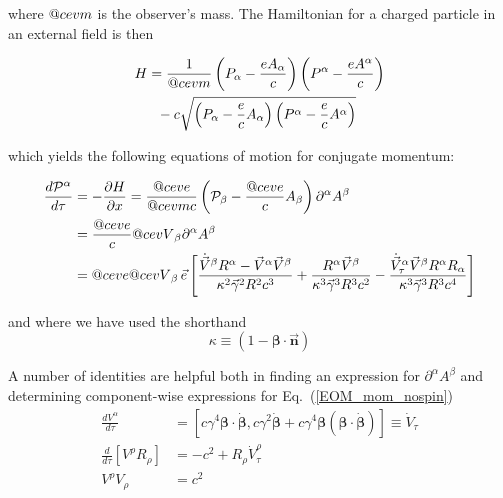 \documentclass[reprint,
               amsmath,amssymb,nofootinbib, aps%
              ]{revtex4-2}
\makeatletter
\DeclareRobustCommand{\cev}[1]{%
  {\mathpalette\do@cev{#1}}%
}
\newcommand{\do@cev}[2]{%
  \vbox{\offinterlineskip
    \sbox\z@{$\m@th#1 x$}%
    \ialign{##\cr
      \hidewidth\reflectbox{$\m@th#1\vec{}\mkern4mu$}\hidewidth\cr
      \noalign{\kern-\ht\z@}
      $\m@th#1#2$\cr
    }%
  }%
}
\makeatother
\begin{document}
\noindent where $\cev{m}$ is the observer's mass. The Hamiltonian for a charged particle in an external field is then~\cite{jackson2012classical,barut1980electrodynamics}

\begin{align}
    H&=\frac{1}{\cev{m}}\left(P_{\alpha}-\frac{e A_{\alpha}}{c}\right)\left(P^{\alpha}-\frac{e A^{\alpha}}{c}\right)
\nonumber \\
&~~-c \sqrt{\left(P_{\alpha}-\frac{e}{c} A_{\alpha}\right)\left(P^{\alpha}-\frac{e}{c} A^{\alpha}\right)}
\end{align}

\noindent which yields the following equations of motion for conjugate momentum:

\begin{align}
\frac{d\mathcal{P}^\alpha}{d\tau}&= -\frac{\partial H}{\partial x} = \frac{\cev{e}}{\cev{m} c} \left(\mathcal{P}_{\beta}-\frac{\cev{e}}{c} A_{\beta}\right) \partial^{\alpha} A^{\beta}
\nonumber \\
&= \frac{\cev{e}}{c} \cev{V}_{\beta} \partial^{\alpha} A^{\beta}
\nonumber \\
&=\cev{e}\cev{V}_\beta\,\vec{e} \left[
\frac{\dot{\vec{V}}^{\beta
} R^{\alpha} - \vec{V}^\alpha \vec{V}^\beta }{\kappa^{2} \vec{\gamma}^2 R^2 c^{3}}
+\frac{R^\alpha \vec{V}^\beta }{\kappa^3 \vec{\gamma}^3 R^3 c^2} - \frac{ \dot{\vec{V}}^{\alpha}_\tau \vec{V}^{\beta} R^{\alpha} R_{\alpha}}{\kappa^3  \vec{\gamma}^3 R^3 c^4}
\right] \nonumber \\
\label{EOM_mom_nospin}
\end{align}

\noindent and where we have used the shorthand
\begin{equation*}
\kappa \equiv (1-\boldsymbol{\beta}\cdot \vec{\boldsymbol{n}})
\end{equation*}

A number of identities are helpful both in finding an expression for $\partial^{\alpha} A^{\beta}$ and determining component-wise expressions for Eq.~(\ref{EOM_mom_nospin})~\cite{jackson2012classical,bordovitsyn_technique_2003}
\begin{align}
\frac{d V^{\alpha}}{d \tau}&=\left[c \gamma^{4} \boldsymbol{\beta} \cdot \dot{\boldsymbol{\beta}}, c \gamma^{2} \dot{\boldsymbol{\beta}}+c \gamma^{4} \boldsymbol{\beta}(\boldsymbol{\beta} \cdot \dot{\boldsymbol{\beta}})\right]\equiv \dot{V}_\tau
\nonumber\\
\frac{d}{d\tau} \left[  V^{\rho} R_{\rho} \right] &= -c^2 + R_\rho \dot{V}_\tau^\rho
\nonumber\\
{V}^\rho V_\rho &= c^2
\end{align}
\end{document}
